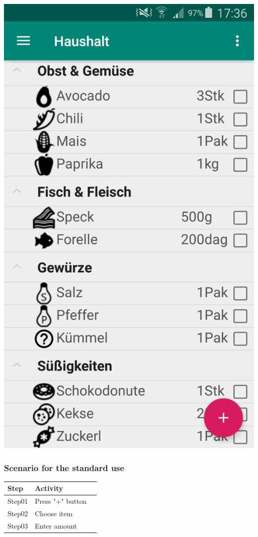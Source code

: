 \documentclass[12pt]{article}
\theoremstyle{definition}
\begin{document}
\includegraphics[scale=0.15]{Images/GUI_Shoppinglist.png}
\\

\subsubsection{Scenario for the standard use}

\begin{tabular}{|l|l|l|}
\hline
Step & Activity \\ \hline
Step01 & Press "+" button \\ \hline
Step02 & Choose item \\ \hline
Step03 & Enter amount \\ \hline
\end{tabular}
\end{document}
